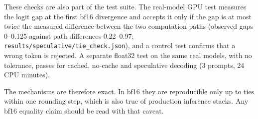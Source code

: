 These checks are also part of the test suite. The real-model GPU test measures the logit gap at the first bf16 divergence and accepts it only if the gap is at most twice the measured difference between the two computation paths (observed gaps 0--0.125 against path differences 0.22--0.97; \texttt{results/speculative/tie\_check.json}), and a control test confirms that a wrong token is rejected. A separate float32 test on the same real models, with no tolerance, passes for cached, no-cache and speculative decoding (3 prompts, 24 CPU minutes).

The mechanisms are therefore exact. In bf16 they are reproducible only up to ties within one rounding step,
which is also true of production inference stacks. Any bf16 equality claim should be read with that caveat.
